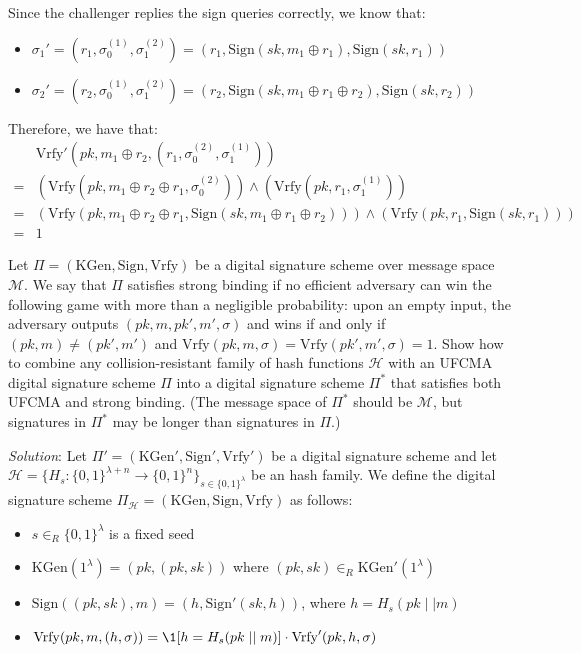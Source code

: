 \documentclass[a4paper, 12pt]{report}
\begin{document}
    Since the challenger replies the sign queries correctly, we know that:
    \begin{itemize}
        \item $\sigma_1' = (r_1, \sigma^{(1)}_0, \sigma_1^{(2)}) = (r_1, \mathrm{Sign}(sk, m_1 \oplus r_1), \mathrm{Sign}(sk, r_1))$
        \item $\sigma_2' = (r_2, \sigma^{(1)}_0, \sigma_1^{(2)}) = (r_2, \mathrm{Sign}(sk, m_1 \oplus r_1 \oplus r_2), \mathrm{Sign}(sk, r_2))$
    \end{itemize}

    Therefore, we have that:
    \[\begin{split}
        &\text{Vrfy}'(pk, m_1 \oplus r_2, (r_1, \sigma^{(2)}_0, \sigma^{(1)}_1)) \\
        =& (\text{Vrfy}(pk, m_1 \oplus r_2 \oplus r_1, \sigma_0^{(2)})) \land (\text{Vrfy}(pk, r_1, \sigma_1^{(1)})) \\
        =& (\text{Vrfy}(pk, m_1 \oplus r_2 \oplus r_1, \mathrm{Sign}(sk, m_1 \oplus r_1 \oplus r_2))) \land (\text{Vrfy}(pk, r_1, \mathrm{Sign}(sk, r_1))) \\
        =& 1
    \end{split}\]

    \begin{framedprob}{}
        Let $\Pi = (\mathrm{KGen}, \mathrm{Sign}, \mathrm{Vrfy})$ be a digital signature scheme over message space $\mathcal{M}$. We say that $\Pi$ satisfies strong binding if no efficient adversary can win the following game with more than a negligible probability: upon an empty input, the adversary outputs $(pk, m, pk', m', \sigma)$ and wins if and only if $(pk, m) \neq (pk', m')$ and $\mathrm{Vrfy}(pk, m, \sigma) = \mathrm{Vrfy}(pk', m', \sigma) = 1$. Show how to combine any collision-resistant family of hash functions $\mathcal{H}$ with an UFCMA digital signature scheme $\Pi$ into a digital signature scheme $\Pi^*$ that satisfies both UFCMA and strong binding. (The message space of $\Pi^*$ should be $\mathcal{M}$, but signatures in $\Pi^*$ may be longer than signatures in $\Pi$.)
    \end{framedprob}

    \textit{Solution}: Let $\Pi' = (\mathrm{KGen}', \mathrm{Sign}', \mathrm{Vrfy}')$ be a digital signature scheme and let $\mathcal{H} = \{H_s : \{0,1\}^{\lambda+n} \to \{0,1\}^n \}_{s \in \{0,1\}^{\lambda}}$ be an hash family. We define the digital signature scheme $\Pi_{\mathcal{H}} = (\mathrm{KGen}, \mathrm{Sign}, \mathrm{Vrfy})$ as follows:
    \begin{itemize}
        \item $s \in_R \{0,1\}^{\lambda}$ is a fixed seed
        \item $\mathrm{KGen}(1^\lambda) = (pk, (pk, sk))$ where $(pk,sk) \in_R \mathrm{KGen}'(1^{\lambda})$
        \item $\mathrm{Sign}((pk,sk), m) = (h, \mathrm{Sign}'(sk, h))$, where $h = H_s(pk \mid\mid m)$
        \item $\mathrm{Vrfy}(pk, m, (h, \sigma)) = \1[h = H_s(pk \mid\mid m)] \cdot \mathrm{Vrfy}'(pk, h, \sigma)$
    \end{itemize}
\end{document}
